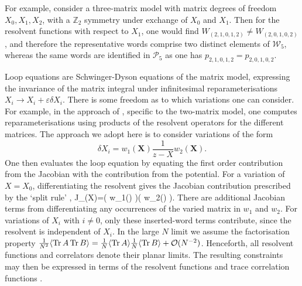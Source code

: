 For example, consider a three-matrix model with matrix degrees of freedom $X_0,X_1,X_2$, with a
$\mathbb{Z}_2$ symmetry under exchange of $X_0$ and $X_1$. Then for the resolvent functions with
respect to $X_1$, one would find $ W_{(2,1,0,1,2)} \neq W_{(2,0,1,0,2)}$, and therefore the
representative words comprise two distinct elements of $\mathcal{W}_5$, whereas the same words are
identified in $\mathcal{P}_5$ as one has $p_{2,1,0,1,2} = p_{2,0,1,0,2}$.

Loop equations are Schwinger-Dyson equations of the matrix model, expressing the invariance of the
matrix integral under infinitesimal reparameterisations $X_i \rightarrow X_i + \varepsilon \delta
    X_i$. There is some freedom as to which variations one can consider. For example, in the approach
of \cite{Eynard:2002kg}, specific to the two-matrix model, one computes reparameterisations using
products of the resolvent operators for the different matrices. The approach we adopt here is to
consider variations of the form
%
\begin{equation}
    \label{reparam}
    \delta X_i = w_1(\mathbf{X}) \frac{1}{z-X} w_2(\mathbf{X}).
\end{equation}
%
One then evaluates the loop equation by equating the first order contribution from the Jacobian
with the contribution from the potential. For a variation of $X=X_0$, differentiating the resolvent
gives the Jacobian contribution prescribed by the `split rule' \cite{Eynard:2002kg}, \beq
    \label{Jsplit} J_{}(X)=\Tr \left( w_1()
    \right)\Tr\left( w_2() \right).
\eeq
There are additional Jacobian terms from differentiating any occurrences of the varied matrix in
$w_1$ and $w_2$. For variations of $X_i$ with $i\neq0$, only these inserted-word terms contribute,
since the resolvent is independent of $X_i$. In the large $N$ limit we assume the factorisation property $\frac{1}{N^2}\langle \mathop{\mathrm{Tr}}\nolimits A \mathop{\mathrm{Tr}}\nolimits B \rangle = \frac{1}{N}\langle \mathop{\mathrm{Tr}}\nolimits A \rangle \frac{1}{N} \langle \mathop{\mathrm{Tr}}\nolimits B \rangle + \mathcal{O}(N^{-2})$. Henceforth, all resolvent functions and correlators denote their planar limits. The resulting constraints may then be expressed in terms of
the resolvent functions  and trace correlation functions .

